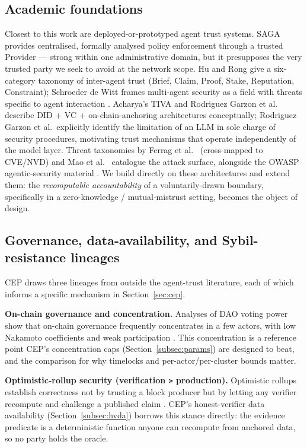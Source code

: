 \subsection{Academic foundations}

Closest to this work are deployed-or-prototyped agent trust systems. SAGA \cite{ref16_syros} provides centralised, formally analysed policy enforcement through a trusted Provider — strong within one administrative domain, but it presupposes the very trusted party we seek to avoid at the network scope. Hu and Rong \cite{ref15_hurong} give a six-category taxonomy of inter-agent trust (Brief, Claim, Proof, Stake, Reputation, Constraint); Schroeder de Witt \cite{ref14_schroederdewitt} frames multi-agent security as a field with threats specific to agent interaction \cite{ref26_motwani}. Acharya's TIVA \cite{ref17_acharya} and Rodriguez Garzon et al.\ \cite{ref36_rodriguezgarzon} describe DID + VC + on-chain-anchoring architectures conceptually; Rodriguez Garzon et al.\ explicitly identify the limitation of an LLM in sole charge of security procedures, motivating trust mechanisms that operate independently of the model layer. Threat taxonomies by Ferrag et al.\ \cite{ref18_ferrag} (cross-mapped to CVE/NVD) and Mao et al.\ \cite{ref20_mao} catalogue the attack surface, alongside the OWASP agentic-security material \cite{ref19_owasp}. We build directly on these architectures and extend them: the \emph{recomputable accountability} of a voluntarily-drawn boundary, specifically in a zero-knowledge / mutual-mistrust setting, becomes the object of design.

\subsection{Governance, data-availability, and Sybil-resistance lineages}
\label{subsec:lineages}

CEP draws three lineages from outside the agent-trust literature, each of which informs a specific mechanism in Section~\ref{sec:cep}.

\textbf{On-chain governance and concentration.} Analyses of DAO voting power show that on-chain governance frequently concentrates in a few actors, with low Nakamoto coefficients and weak participation \cite{ref39_daogov}. This concentration is a reference point CEP's concentration caps (Section~\ref{subsec:params}) are designed to beat, and the comparison for why timelocks and per-actor/per-cluster bounds matter.

\textbf{Optimistic-rollup security (verification \texttt{>} production).} Optimistic rollups establish correctness not by trusting a block producer but by letting any verifier recompute and challenge a published claim \cite{ref38_arbitrum}. CEP's honest-verifier data availability (Section~\ref{subsec:hvda}) borrows this stance directly: the evidence predicate is a deterministic function anyone can recompute from anchored data, so no party holds the oracle.


